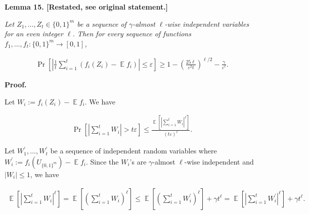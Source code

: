 \documentclass[10pt,a4paper]{article}
\begin{document}





\par\medskip\noindent\textbf{
\textbf{Lemma 15}\textbf{.}
[Restated, see original statement.]}\par



\emph{Let $Z_{1},\dots,Z_{t}\in\{0,1\}^{m}$ be a sequence of $\gamma$-almost $\ell$-wise independent variables for an even integer $\ell$. Then for every sequence of functions $f_{1},\dots,f_{t}:\{0,1\}^{m}\to[0,1]$,}\par


\[\begin{gathered}
\Pr\left[\left|\frac{1}{t}\sum_{i=1}^{t}(f_{i}(Z_{i})-\operatorname*{\mathbb{E}}f_{i})\right|\leq\varepsilon\right]\geq 1-\left(\frac{25{\ell}}{\varepsilon^{2}{t}}\right)^{\ell/2}-\frac{\gamma}{\varepsilon^{\ell}}.
\end{gathered}\]







\par\medskip\noindent\textbf{Proof.}\par




Let $W_{i}:=f_{i}(Z_{i})-\operatorname*{\mathbb{E}}f_{i}$.
We have\par


\[\begin{gathered}
\displaystyle\Pr\left[\left|\sum_{i=1}^{t}W_{i}\right|>t\varepsilon\right]\leq\frac{\operatorname*{\mathbb{E}}\left[\left|\sum_{i=1}^{t}W_{i}\right|^{\ell}\right]}{(t\varepsilon)^{\ell}}.
\end{gathered}\]


Let $W_{1}^{\prime},\dots,W_{t}^{\prime}$ be a sequence of independent random variables where $W_{i}^{\prime}:=f_{i}(U_{\{0,1\}^{m}})-\operatorname*{\mathbb{E}}f_{i}$. Since the $W_{i}$’s are $\gamma$-almost $\ell$-wise independent and $|W_{i}|\leq 1$, we have\par


\[\begin{gathered}
\operatorname*{\mathbb{E}}\left[\left|\sum_{i=1}^{t}W_{i}\right|^{\ell}\right]=\operatorname*{\mathbb{E}}\left[\left(\sum_{i=1}^{t}W_{i}\right)^{\ell}\right]\leq\operatorname*{\mathbb{E}}\left[\left(\sum_{i=1}^{t}W_{i}^{\prime}\right)^{\ell}\right]+\gamma t^{\ell}=\operatorname*{\mathbb{E}}\left[\left|\sum_{i=1}^{t}W_{i}^{\prime}\right|^{\ell}\right]+\gamma t^{\ell}.
\end{gathered}\]
\end{document}
